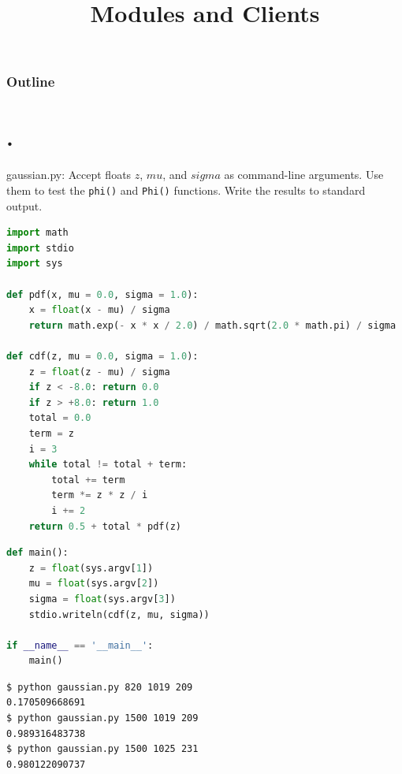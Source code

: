 \documentclass[8pt,a4paper,compress,handout]{beamer}
\title{Modules and Clients}
\date{}
\begin{document}
\begin{frame}
\vfill
\titlepage
\end{frame}

\begin{frame}
\frametitle{Outline}
\tableofcontents
\end{frame}

\section{.}
\begin{frame}[fragile]
\begin{framed}
\tiny gaussian.py: Accept floats $z$, $mu$, and $sigma$ as command-line arguments. Use them to test the \lstinline{phi()} and \lstinline{Phi()} functions. Write the results to standard output.
\end{framed}

\begin{lstlisting}[language=Python]
import math
import stdio
import sys

def pdf(x, mu = 0.0, sigma = 1.0):
    x = float(x - mu) / sigma
    return math.exp(- x * x / 2.0) / math.sqrt(2.0 * math.pi) / sigma

def cdf(z, mu = 0.0, sigma = 1.0):
    z = float(z - mu) / sigma
    if z < -8.0: return 0.0
    if z > +8.0: return 1.0
    total = 0.0
    term = z
    i = 3
    while total != total + term:
        total += term
        term *= z * z / i
        i += 2
    return 0.5 + total * pdf(z)
\end{lstlisting}
\end{frame}

\begin{frame}[fragile]
\begin{lstlisting}[language=Python]
def main():
    z = float(sys.argv[1])
    mu = float(sys.argv[2])
    sigma = float(sys.argv[3])
    stdio.writeln(cdf(z, mu, sigma))

if __name__ == '__main__':
    main()
\end{lstlisting}

\begin{lstlisting}[language={}]
$ python gaussian.py 820 1019 209
0.170509668691
$ python gaussian.py 1500 1019 209
0.989316483738
$ python gaussian.py 1500 1025 231
0.980122090737
\end{lstlisting}
\end{frame}
\end{document}
